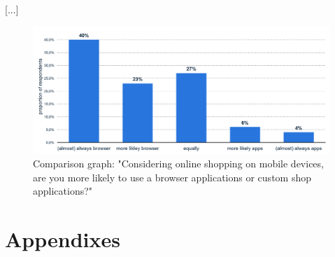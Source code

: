 [...]

\begin{figure}[!ht]
	\begin{center}
		\includegraphics[width=\textwidth]{./Images/mia_browser_vs_apps_diagram.png}
	\end{center}
	\caption{Comparison graph: "Considering online shopping on mobile devices, are you more likely to use a browser applications or custom shop applications?"~\cite[The survey question as well as the captions of the graph are translated to english in a contextual manner.]{nutzungeinesbrowsersshopeigenerapp_06.08.2019}}
	\label{fig:comparison-mia-browser-vs-apps-diagram}
\end{figure}

\chapter{Appendixes}
\label{ch:appendixes}

\listoffigures %

\printacronyms %

\listoftables %


